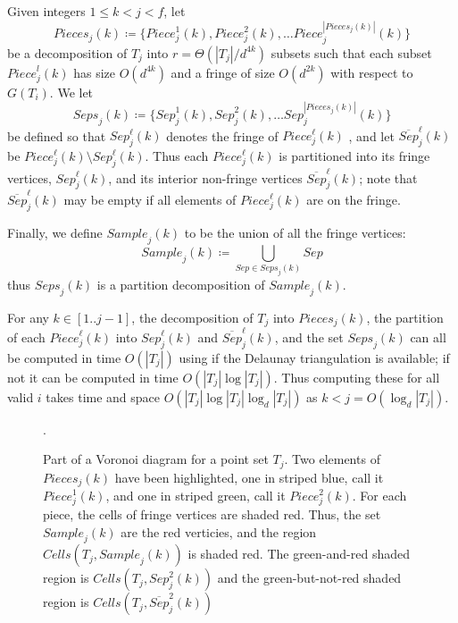 \documentclass[12pt,a4paper,USenglish,cleveref, autoref, thm-restate]{article}
\newcommand{\Cells}{\mathit{Cells}}
\newcommand{\Sample}{\mathit{Sample}}
\newcommand{\Piece}{\mathit{Piece}}
\newcommand{\Pieces}{\mathit{Pieces}}
\newcommand{\Sep}{\mathit{Sep}}
\newcommand{\Seps}{\mathit{Seps}}
\newcommand{\john}[1]{\textcolor{red}{#1}}
\newcommand{\Cells}{\mathit{Cells}}
\newcommand{\Sample}{\mathit{Sample}}
\newcommand{\Piece}{\mathit{Piece}}
\newcommand{\Pieces}{\mathit{Pieces}}
\newcommand{\Sep}{\mathit{Sep}}
\newcommand{\Seps}{\mathit{Seps}}
\newcommand{\john}[1]{\textcolor{red}{#1}}
\newcommand{\Cells}{\mathit{Cells}}
\newcommand{\Sample}{\mathit{Sample}}
\newcommand{\Piece}{\mathit{Piece}}
\newcommand{\Pieces}{\mathit{Pieces}}
\newcommand{\Sep}{\mathit{Sep}}
\newcommand{\Seps}{\mathit{Seps}}
\newcommand{\john}[1]{\textcolor{red}{#1}}
\begin{document}
Given integers $1 \leq k<j<f$, let 
\[
    \Pieces_j(k) \coloneqq \{\Piece_j^1(k), \Piece^2_j(k), \ldots  \Piece^{|\Pieces_j(k)|}_j(k)\}
\]
be a decomposition of $T_j$ into $r=\Theta(|T_j|/d^{4k})$ subsets such that each subset $\Piece^l_j(k)$  has size $O(d^{4k})$
and a fringe of size $O({d^{2k}})$ with respect to $G(T_i)$. We let \[ \Seps_j(k) \coloneqq \{\Sep_j^1(k), \Sep^2_j(k), \ldots  \Sep^{|\Pieces_j(k)|}_j(k)\}\] be defined so that 
$\Sep_j^\ell(k)$ denotes the fringe of $\Piece_j^\ell(k)$ , and let $\overline{Sep}_j^\ell(k)$ be $\Piece_j^\ell(k) \setminus \Sep_j^\ell(k)$. 
Thus each $\Piece_j^\ell(k)$  is partitioned into its fringe vertices, $\Sep_j^\ell(k)$, and its interior non-fringe  vertices $\overline{\Sep}_j^\ell(k)$; note that $\overline{\Sep}_j^\ell(k)$ may be empty if all elements of $\Piece_j^\ell(k)$ are on the fringe.

Finally, we define $\Sample_j(k)$ to be the union of all the fringe vertices: 
\[\Sample_j(k) \coloneqq \bigcup_{Sep \in \Seps_j(k)} Sep \]
thus $\Seps_j(k)$ is a partition decomposition of $\Sample_j(k)$.


For any $k\in [1.. j-1]$, the decomposition of $T_j$ into $\Pieces_j(k)$,
the partition  of each $\Piece_j^\ell(k)$ into 
$\Sep_j^\ell(k)$ and $\overline{Sep}_j^\ell(k)$, 
and the set $\Seps_j(k)$  can all be computed in time $O(|T_j|)$ using \cite{KleinMS13} if the Delaunay triangulation is available; if not it can be computed in time $O(|T_j| \log |T_j|)$. Thus computing these for all valid $i$ takes time and space $O(|T_j| \log |T_j| \log_d |T_j|)$ as $k < j=O(\log_d |T_j|)$. %
\begin{figure}[t]
    \centering
    \caption{Part of a Voronoi diagram for a point set $T_j$.
    Two elements of $\Pieces_j(k)$ have been highlighted, one in striped blue, call it $\Piece_j^1(k)$, and one in striped green, call it $\Piece_j^2(k)$.
    For each piece, the cells of fringe vertices are shaded red. Thus, the set $\Sample_j(k)$ are the red verticies, and the region $\Cells(T_j,\Sample_j(k))$ is shaded red.
    The green-and-red shaded region is $\Cells(T_j,\Sep_j^2(k))$ and the green-but-not-red shaded region is $\Cells(T_j,\overline{\Sep}_j^2(k))$}.
    \label{fig:separ}
\end{figure}
\end{document}
